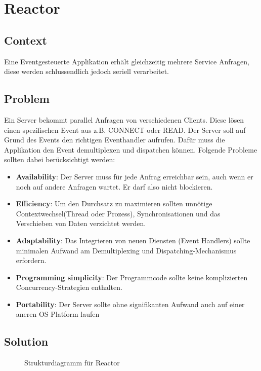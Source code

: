 \chapter{Reactor}

\section{Context}
Eine Eventgesteuerte Applikation erhält gleichzeitig mehrere Service Anfragen, diese werden schlussendlich jedoch seriell verarbeitet.

\section{Problem}
Ein Server bekommt parallel Anfragen von verschiedenen Clients. Diese lösen einen spezifischen Event aus z.B. CONNECT oder READ. Der Server soll auf Grund des Events den richtigen Eventhandler aufrufen. Dafür muss die Applikation den Event demultiplexen und dispatchen können. Folgende Probleme sollten dabei berücksichtigt werden:
\begin{itemize}
  \item \textbf{Availability}: Der Server muss für jede Anfrag erreichbar sein, auch wenn er noch auf andere Anfragen wartet. Er darf also nicht blockieren.
  \item \textbf{Efficiency}: Um den Durchsatz zu maximieren sollten unnötige Contextwechsel(Thread oder Prozess), Synchronisationen und das Verschieben von Daten verzichtet werden.
  \item \textbf{Adaptability}: Das Integrieren von neuen Diensten (Event Handlers) sollte minimalen Aufwand am Demultiplexing und Dispatching-Mechanismus erfordern.
  \item \textbf{Programming simplicity}: Der Programmcode sollte keine komplizierten Concurrency-Strategien enthalten.
  \item \textbf{Portability}: Der Server sollte ohne signifikanten Aufwand auch auf einer aneren OS Platform laufen
\end{itemize}

\section{Solution}
\begin{figure}[H]
  \centering
  
  \caption{Strukturdiagramm f\"ur Reactor}
\end{figure}

